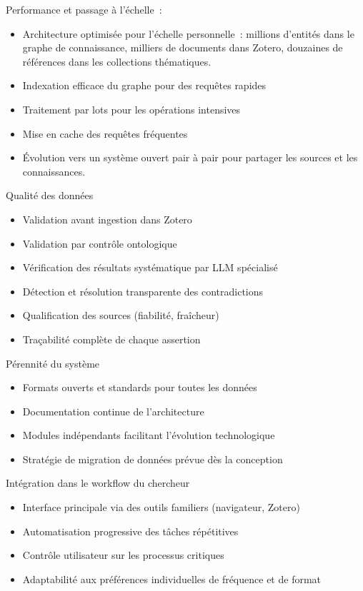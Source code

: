 \documentclass[a4paper,11pt]{report}
\providecommand{\tightlist}{\setlength{\itemsep}{0pt}\setlength{\parskip}{0pt}}
\begin{document}
Performance et passage à l'échelle~:

\begin{itemize}
\tightlist
\item
  Architecture optimisée pour l'échelle personnelle~: millions d'entités dans le graphe de connaissance, milliers de documents dans Zotero, douzaines de références dans les collections thématiques.
\item
  Indexation efficace du graphe pour des requêtes rapides
\item
  Traitement par lots pour les opérations intensives
\item
  Mise en cache des requêtes fréquentes
\item
  Évolution vers un système ouvert pair à pair pour partager les sources et les connaissances.
\end{itemize}

Qualité des données

\begin{itemize}
\tightlist
\item
  Validation avant ingestion dans Zotero
\item
  Validation par contrôle ontologique
\item
  Vérification des résultats systématique par LLM spécialisé
\item
  Détection et résolution transparente des contradictions
\item
  Qualification des sources (fiabilité, fraîcheur)
\item
  Traçabilité complète de chaque assertion
\end{itemize}

Pérennité du système

\begin{itemize}
\tightlist
\item
  Formats ouverts et standards pour toutes les données
\item
  Documentation continue de l'architecture
\item
  Modules indépendants facilitant l'évolution technologique
\item
  Stratégie de migration de données prévue dès la conception
\end{itemize}

Intégration dans le workflow du chercheur

\begin{itemize}
\tightlist
\item
  Interface principale via des outils familiers (navigateur, Zotero)
\item
  Automatisation progressive des tâches répétitives
\item
  Contrôle utilisateur sur les processus critiques
\item
  Adaptabilité aux préférences individuelles de fréquence et de format
\end{itemize}
\end{document}
